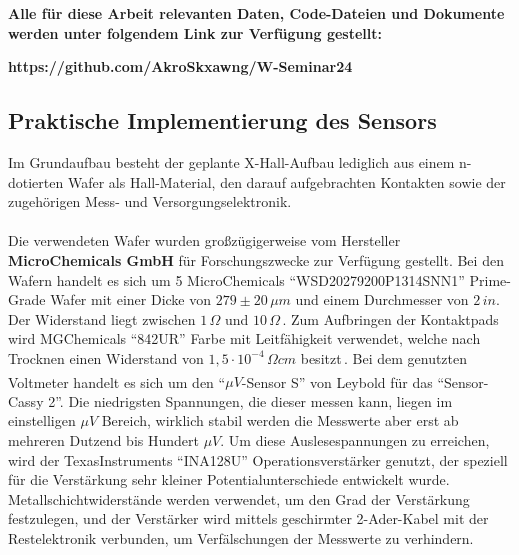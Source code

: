 \documentclass[12pt, a4paper]{article}
\begin{document}
{\raggedright
\textbf{Alle für diese Arbeit relevanten Daten, Code-Dateien und Dokumente werden unter folgendem Link zur Verfügung gestellt:}}
\begin{center}
	 \textbf{https://github.com/AkroSkxawng/W-Seminar24}
\end{center}



\subsection{Praktische Implementierung des Sensors}
Im Grundaufbau besteht der geplante X-Hall-Aufbau lediglich aus einem n-dotierten Wafer als Hall-Material, den darauf aufgebrachten Kontakten sowie der zugehörigen Mess- und Versorgungselektronik.\paragraph{}
Die verwendeten Wafer wurden großzügigerweise vom Hersteller \textbf{MicroChemicals GmbH} für Forschungszwecke zur Verfügung gestellt.\newline
Bei den Wafern handelt es sich um 5 MicroChemicals ``WSD20279200P1314SNN1'' Prime-Grade Wafer mit einer Dicke von $279\pm20\,\mu{m}$ und einem Durchmesser von $2\,in$. Der Widerstand liegt zwischen $1\,\Omega$ und $10\,\Omega$\,\cite{mcChem}.\newline
Zum Aufbringen der Kontaktpads wird MGChemicals ``842UR'' Farbe mit Leitfähigkeit verwendet, welche nach Trocknen einen Widerstand von $1,5\cdot10^{-4}\,\Omega{cm}$ besitzt\,\cite{mgChem}.\newline
Bei dem genutzten Voltmeter handelt es sich um den ``$\mu{V}$-Sensor S'' von Leybold\textsuperscript{\textregistered} für das ``Sensor-Cassy 2''. Die niedrigsten Spannungen, die dieser messen kann, liegen im einstelligen $\mu{V}$ Bereich, wirklich stabil werden die Messwerte aber erst ab mehreren Dutzend bis Hundert $\mu{V}$.\newline
Um diese Auslesespannungen zu erreichen, wird der TexasInstruments ``INA128U'' Operationsverstärker genutzt, der speziell für die Verstärkung sehr kleiner Potentialunterschiede entwickelt wurde. Metallschichtwiderstände werden verwendet, um den Grad der Verstärkung festzulegen, und der Verstärker wird mittels geschirmter 2-Ader-Kabel mit der Restelektronik verbunden, um Verfälschungen der Messwerte zu verhindern.\paragraph{}
\end{document}
